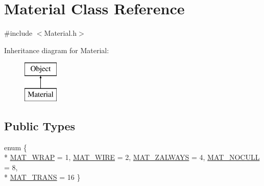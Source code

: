 \hypertarget{class_material}{}\section{Material Class Reference}
\label{class_material}


{\ttfamily \#include $<$Material.\+h$>$}

Inheritance diagram for Material\+:\begin{figure}[H]
\begin{center}
\leavevmode
\includegraphics[height=2.000000cm]{class_material}
\end{center}
\end{figure}
\subsection*{Public Types}
\begin{DoxyCompactItemize}
\item 
enum \{ \\*
\hyperlink{class_material_a714370cb1e994ee8e526c1939530767fa237d6499dca28b1474ce39e09a90d492}{M\+A\+T\+\_\+\+W\+R\+AP} = 1, 
\hyperlink{class_material_a714370cb1e994ee8e526c1939530767fac6eac59fb07a11b02c2211a500275eec}{M\+A\+T\+\_\+\+W\+I\+RE} = 2, 
\hyperlink{class_material_a714370cb1e994ee8e526c1939530767fa5fcfa59c022ac6b23fb611ec8977abcf}{M\+A\+T\+\_\+\+Z\+A\+L\+W\+A\+YS} = 4, 
\hyperlink{class_material_a714370cb1e994ee8e526c1939530767fac095e1e2b52c4a352ece6c2d72f1c9dc}{M\+A\+T\+\_\+\+N\+O\+C\+U\+LL} = 8, 
\\*
\hyperlink{class_material_a714370cb1e994ee8e526c1939530767fabc06c866b4977529a1be0f5a01967c86}{M\+A\+T\+\_\+\+T\+R\+A\+NS} = 16
 \}
\end{DoxyCompactItemize}
